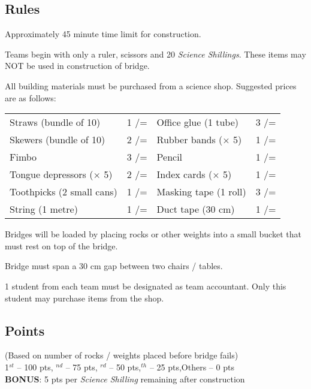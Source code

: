 \subsection{Rules}
\begin{itemize*}
\item Approximately 45 minute time limit for construction.
\item Teams begin with only a ruler, scissors and 20 \emph{Science Shillings}. These items may NOT be used in construction of bridge.
\item All building materials must be purchased from a science shop. Suggested prices are as follows:\\

\begin{tabular}{p{} p{} p{} p{}}
Straws (bundle of 10)	& 1 /=	&	Office glue (1 tube)	&	3 /=\\
Skewers (bundle of 10) &	2 /=	&	Rubber bands ($\times$ 5)	&	1 /=\\
Fimbo		&		3 /=	&	Pencil 		&		1 /=\\
Tongue depressors ($\times$ 5)	 & 2 /=	&	Index cards ($\times$ 5)	&	1 /=\\
Toothpicks (2 small cans) &	1 /=	&	Masking tape (1 roll)	&	3 /=\\
String (1 metre)	&	1 /=	&	Duct tape (30 cm)	&	1 /=\\[10pt]
\end{tabular}

\item Bridges will be loaded by placing rocks or other weights into a small bucket that must rest on top of the bridge.
\item Bridge must span a 30 cm gap between two chairs / tables.
\item 1 student from each team must be designated as team accountant. Only this student may purchase items from the shop.
\end{itemize*}

\subsection{Points}
(Based on number of rocks / weights placed before bridge fails)\\
1$^{st}$ – 100 pts, $^{nd}$ – 75 pts, $^{rd}$ – 50 pts,$^{th}$ – 25 pts,\quad 	Others – 0 pts\\
\textbf{BONUS}: 5 pts per \emph{Science Shilling} remaining after construction

